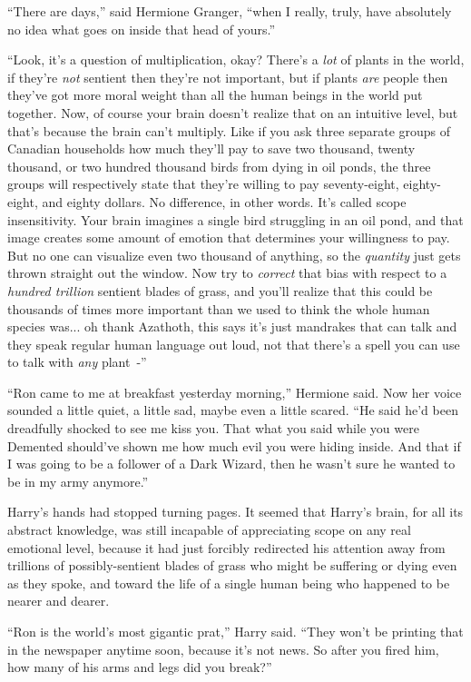 ``There are days,'' said Hermione Granger, ``when I really, truly, have absolutely no idea what goes on inside that head of yours.''

``Look, it's a question of multiplication, okay? There's a \emph{lot} of plants in the world, if they're \emph{not} sentient then they're not important, but if plants \emph{are} people then they've got more moral weight than all the human beings in the world put together. Now, of course your brain doesn't realize that on an intuitive level, but that's because the brain can't multiply. Like if you ask three separate groups of Canadian households how much they'll pay to save two thousand, twenty thousand, or two hundred thousand birds from dying in oil ponds, the three groups will respectively state that they're willing to pay seventy-eight, eighty-eight, and eighty dollars. No difference, in other words. It's called scope insensitivity. Your brain imagines a single bird struggling in an oil pond, and that image creates some amount of emotion that determines your willingness to pay. But no one can visualize even two thousand of anything, so the \emph{quantity} just gets thrown straight out the window. Now try to \emph{correct} that bias with respect to a \emph{hundred trillion} sentient blades of grass, and you'll realize that this could be thousands of times more important than we used to think the whole human species was... oh thank Azathoth, this says it's just mandrakes that can talk and they speak regular human language out loud, not that there's a spell you can use to talk with \emph{any} plant~-''

``Ron came to me at breakfast yesterday morning,'' Hermione said. Now her voice sounded a little quiet, a little sad, maybe even a little scared. ``He said he'd been dreadfully shocked to see me kiss you. That what you said while you were Demented should've shown me how much evil you were hiding inside. And that if I was going to be a follower of a Dark Wizard, then he wasn't sure he wanted to be in my army anymore.''

Harry's hands had stopped turning pages. It seemed that Harry's brain, for all its abstract knowledge, was still incapable of appreciating scope on any real emotional level, because it had just forcibly redirected his attention away from trillions of possibly-sentient blades of grass who might be suffering or dying even as they spoke, and toward the life of a single human being who happened to be nearer and dearer.

``Ron is the world's most gigantic prat,'' Harry said. ``They won't be printing that in the newspaper anytime soon, because it's not news. So after you fired him, how many of his arms and legs did you break?''

